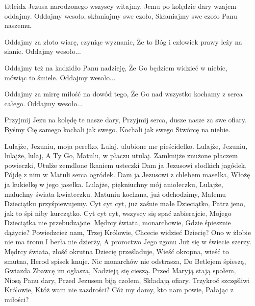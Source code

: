 \documentclass[a5paper, portrait, 12pt]{mwart}
\begin{document}
\begin{songs}{titleidx}
\beginverse
Jezusa narodzonego wszyscy witajmy,
Jemu po kolędzie dary wzajem oddajmy.
\endverse
\beginchorus
Oddajmy wesoło, skłaniajmy swe czoło,
Skłaniajmy swe czoło Panu naszemu.
\endchorus

\beginverse
Oddajmy za złoto wiarę, czyniąc wyznanie,
Że to Bóg i człowiek prawy leży na sianie.
\endverse
\beginchorus
Oddajmy wesoło...
\endchorus

\beginverse
Oddajmy też na kadzidło Panu nadzieję,
Że Go będziem widzieć w niebie, mówiąc to śmiele.
\endverse
\beginchorus
Oddajmy wesoło...
\endchorus

\beginverse
Oddajmy za mirrę miłość na dowód tego,
Że Go nad wszystko kochamy z serca całego.
\endverse
\beginchorus
Oddajmy wesoło...
\endchorus

\beginverse
Przyjmij Jezu na kolędę te nasze dary,
Przyjmij serca, dusze nasze za swe ofiary.
Byśmy Cię samego kochali jak swego.
Kochali jak swego Stwórcę na niebie.
\endverse
\endsong


\beginverse
    Lulajże, Jezuniu, moja perełko,
    Lulaj, ulubione me pieścidełko.
\endverse
\beginchorus
        Lulajże, Jezuniu, lulajże, lulaj,
        A Ty Go, Matulu, w płaczu utulaj.
\endchorus
\beginverse
    Zamknijże znużone płaczem powieczki,
    Utulże zemdlone łkaniem usteczki
\endverse
\beginverse
    Dam ja Jezusowi słodkich jagódek,
    Pójdę z nim w Matuli serca ogródek.
\endverse
\beginverse
    Dam ja Jezusowi z chlebem masełka,
    Włożę ja kukiełkę w jego jasełka.
\endverse
\beginverse
    Lulajże, piękniuchny mój aniołeczku,
    Lulajże, maluchny świata kwiateczku.
\endverse
\beginverse
    Matuniu kochana, już odchodzimy,
    Małemu Dzieciątku przyśpiewujemy.
\endverse
\beginverse
    Cyt cyt cyt, już zaśnie małe Dzieciątko,
    Patrz jeno, jak to śpi niby kurczątko.
\endverse
\beginverse
    Cyt cyt cyt, wszyscy się spać zabierajcie,
    Mojego Dzieciątka nie przebudzajcie.
\endverse
\endsong
\beginverse
    Mędrcy świata, monarchowie,
    Gdzie śpiesznie dążycie?
    Powiedzcież nam, Trzej Królowie,
    Chcecie widzieć Dziecię?
\endverse
\beginchorus
    Ono w żłobie nie ma tronu
    I berła nie dzierży,
    A proroctwo Jego zgonu
    Już się w świecie szerzy.
\endchorus
\beginverse
    Mędrcy świata, złość okrutna
    Dziecię prześladuje,
    Wieść okropna, wieść to smutna,
    Herod spisek knuje.
\endverse
\beginchorus
    Nic monarchów nie odstrasza,
    Do Betlejem śpieszą,
    Gwiazda Zbawcę im ogłasza,
    Nadzieją się cieszą.
\endchorus
\beginverse
    Przed Maryją stają społem,
    Niosą Panu dary,
    Przed Jezusem biją czołem,
    Składają ofiary.
\endverse
\beginchorus
    Trzykroć szczęśliwi Królowie,
    Któż wam nie zazdrości?
    Cóż my damy, kto nam powie,
    Pałając z miłości?
\endchorus
\endsong



\end{songs}
\end{document}
